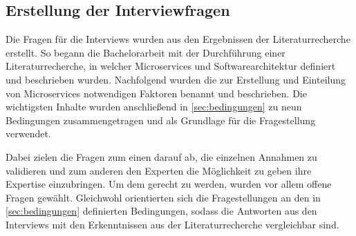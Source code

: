 \subsection{Erstellung der Interviewfragen}

Die Fragen für die Interviews wurden aus den Ergebnissen der Literaturrecherche erstellt. So begann die Bachelorarbeit mit der Durchführung einer Literaturrecherche, in welcher Microservices und Softwarearchitektur definiert und beschrieben wurden. Nachfolgend wurden die zur Erstellung und Einteilung von Microservices notwendigen Faktoren benannt und beschrieben.  Die wichtigsten Inhalte wurden anschließend in \cref{sec:bedingungen} zu neun Bedingungen zusammengetragen und als Grundlage für die Fragestellung verwendet.

Dabei zielen die Fragen zum einen darauf ab, die einzelnen Annahmen zu validieren und zum anderen den Experten die Möglichkeit zu geben ihre Expertise einzubringen. Um dem gerecht zu werden, wurden vor allem offene Fragen gewählt. Gleichwohl orientierten sich die Fragestellungen an den in \cref{sec:bedingungen} definierten Bedingungen, sodass die Antworten aus den Interviews mit den Erkenntnissen aus der Literaturrecherche vergleichbar sind.